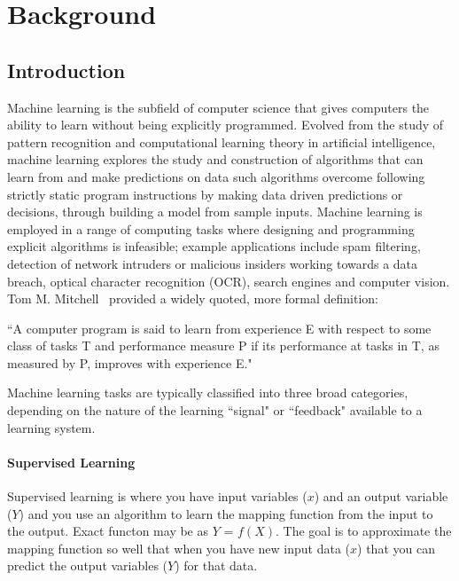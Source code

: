 \chapter{Background}\label{background}

\section{Introduction}
Machine learning is the subfield of computer science that gives computers the ability to learn
without being explicitly programmed. Evolved from the study of pattern recognition and computational
learning theory in artificial intelligence, machine learning explores the study and
construction of algorithms that can learn from and make predictions on data such algorithms
overcome following strictly static program instructions by making data driven predictions or
decisions, through building a model from sample inputs. Machine learning is employed in a
range of computing tasks where designing and programming explicit algorithms is infeasible;
example applications include spam filtering, detection of network intruders or malicious insiders
working towards a data breach, optical character recognition (OCR), search engines and
computer vision.\\

Tom M. Mitchell~\cite{Michalski2013ml} provided a widely quoted, more formal definition:

``A computer program is said to learn from experience E with respect to some class
of tasks T and performance measure P if its performance at tasks in T, as measured
by P, improves with experience E."

Machine learning tasks are typically classified into three broad categories, depending on the
nature of the learning ``signal" or ``feedback" available to a learning system.

\subsubsection{Supervised Learning}
Supervised learning is where you have input variables ($x$) and an output variable ($Y$) and
you use an algorithm to learn the mapping function from the input to the output. Exact functon
may be as $Y$ = $f(X)$. The goal is to approximate the mapping function so well that when you
have new input data ($x$) that you can predict the output variables ($Y$) for that data.

